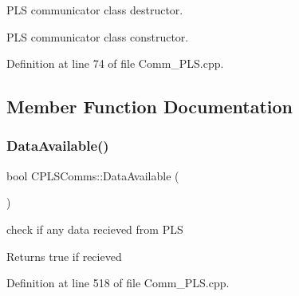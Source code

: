 P\+LS communicator class destructor. 

P\+LS communicator class constructor. 

Definition at line 74 of file Comm\+\_\+\+P\+L\+S.\+cpp.



\subsection{Member Function Documentation}
\mbox{\label{class_c_p_l_s_comms_ae9d000eff184034954829d76162654a5}} 
\subsubsection{\texorpdfstring{Data\+Available()}{DataAvailable()}}
{\footnotesize\ttfamily bool C\+P\+L\+S\+Comms\+::\+Data\+Available (\begin{DoxyParamCaption}{ }\end{DoxyParamCaption})}



check if any data recieved from P\+LS 

\begin{DoxyReturn}{Returns}
true if recieved 
\end{DoxyReturn}


Definition at line 518 of file Comm\+\_\+\+P\+L\+S.\+cpp.


